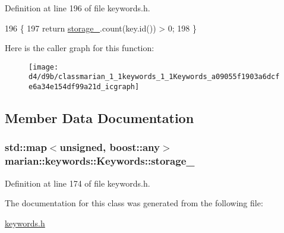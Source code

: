Definition at line 196 of file keywords.\+h.


\begin{DoxyCode}
196                       \{
197     \textcolor{keywordflow}{return} \hyperlink{classmarian_1_1keywords_1_1Keywords_ac4af771537df4c0eff59466cf446ac34}{storage\_}.count(key.id()) > 0;
198   \}
\end{DoxyCode}


Here is the caller graph for this function\+:
\nopagebreak
\begin{figure}[H]
\begin{center}
\leavevmode
\texttt{[image: d4/d9b/classmarian\_1\_1keywords\_1\_1Keywords\_a09055f1903a6dcfe6a34e154df99a21d\_icgraph]}
\end{center}
\end{figure}




\subsection{Member Data Documentation}
\subsubsection[{\texorpdfstring{storage\+\_\+}{storage_}}]{\setlength{\rightskip}{0pt plus 5cm}std\+::map$<$unsigned, boost\+::any$>$ marian\+::keywords\+::\+Keywords\+::storage\+\_\+\hspace{0.3cm}{\ttfamily [private]}}\hypertarget{classmarian_1_1keywords_1_1Keywords_ac4af771537df4c0eff59466cf446ac34}{}\label{classmarian_1_1keywords_1_1Keywords_ac4af771537df4c0eff59466cf446ac34}


Definition at line 174 of file keywords.\+h.



The documentation for this class was generated from the following file\+:\begin{DoxyCompactItemize}
\item 
\hyperlink{keywords_8h}{keywords.\+h}\end{DoxyCompactItemize}
